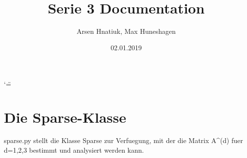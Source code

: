 \documentclass[letterpaper,10pt,ngerman]{sphinxmanual}
\title{Serie 3 Documentation}
\date{02.01.2019}
\author{Arsen Hnatiuk, Max Huneshagen}
\begin{document}
\ifnum\catcode`\"=\active{}\fi
\maketitle
\sphinxtableofcontents
{}\label{\detokenize{index::doc}}



\chapter{Die Sparse-Klasse}
\label{\detokenize{index:module-sparse_erw}}\label{\detokenize{index:die-sparse-klasse}}\label{\detokenize{index:welcome-to-serie-3-s-documentation}}
sparse.py stellt die Klasse Sparse zur Verfuegung, mit der die Matrix A\textasciicircum{}(d) fuer d=1,2,3
bestimmt und analysiert werden kann.
\end{document}
